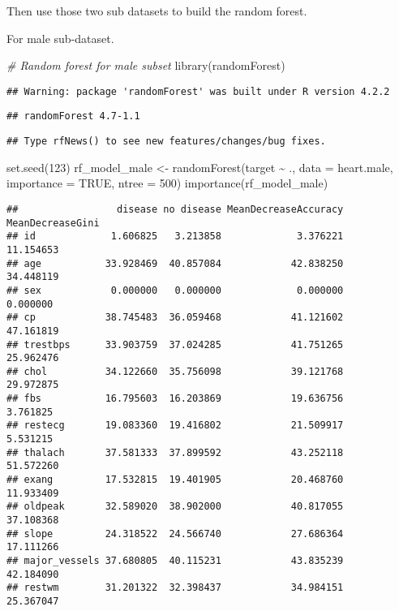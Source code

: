 \documentclass[
]{article}
\newenvironment{Shaded}{\begin{snugshade}}{\end{snugshade}}
\newcommand{\AttributeTok}[1]{\textcolor[rgb]{0.77,0.63,0.00}{#1}}
\newcommand{\CommentTok}[1]{\textcolor[rgb]{0.56,0.35,0.01}{\textit{#1}}}
\newcommand{\ConstantTok}[1]{\textcolor[rgb]{0.00,0.00,0.00}{#1}}
\newcommand{\DecValTok}[1]{\textcolor[rgb]{0.00,0.00,0.81}{#1}}
\newcommand{\FunctionTok}[1]{\textcolor[rgb]{0.00,0.00,0.00}{#1}}
\newcommand{\NormalTok}[1]{#1}
\newcommand{\OtherTok}[1]{\textcolor[rgb]{0.56,0.35,0.01}{#1}}
\newcommand{\SpecialCharTok}[1]{\textcolor[rgb]{0.00,0.00,0.00}{#1}}
\begin{document}
Then use those two sub datasets to build the random forest.

For male sub-dataset.

\begin{Shaded}
\begin{Highlighting}[]
\CommentTok{\# Random forest for male subset}
\FunctionTok{library}\NormalTok{(randomForest)}
\end{Highlighting}
\end{Shaded}

\begin{verbatim}
## Warning: package 'randomForest' was built under R version 4.2.2
\end{verbatim}

\begin{verbatim}
## randomForest 4.7-1.1
\end{verbatim}

\begin{verbatim}
## Type rfNews() to see new features/changes/bug fixes.
\end{verbatim}

\begin{Shaded}
\begin{Highlighting}[]
\FunctionTok{set.seed}\NormalTok{(}\DecValTok{123}\NormalTok{)}
\NormalTok{rf\_model\_male }\OtherTok{\textless{}{-}} \FunctionTok{randomForest}\NormalTok{(target }\SpecialCharTok{\textasciitilde{}}\NormalTok{ ., }\AttributeTok{data =}\NormalTok{ heart.male, }\AttributeTok{importance =} \ConstantTok{TRUE}\NormalTok{, }\AttributeTok{ntree =} \DecValTok{500}\NormalTok{)}
\FunctionTok{importance}\NormalTok{(rf\_model\_male)}
\end{Highlighting}
\end{Shaded}

\begin{verbatim}
##                 disease no disease MeanDecreaseAccuracy MeanDecreaseGini
## id             1.606825   3.213858             3.376221        11.154653
## age           33.928469  40.857084            42.838250        34.448119
## sex            0.000000   0.000000             0.000000         0.000000
## cp            38.745483  36.059468            41.121602        47.161819
## trestbps      33.903759  37.024285            41.751265        25.962476
## chol          34.122660  35.756098            39.121768        29.972875
## fbs           16.795603  16.203869            19.636756         3.761825
## restecg       19.083360  19.416802            21.509917         5.531215
## thalach       37.581333  37.899592            43.252118        51.572260
## exang         17.532815  19.401905            20.468760        11.933409
## oldpeak       32.589020  38.902000            40.817055        37.108368
## slope         24.318522  24.566740            27.686364        17.111266
## major_vessels 37.680805  40.115231            43.835239        42.184090
## restwm        31.201322  32.398437            34.984151        25.367047
\end{verbatim}
\end{document}

